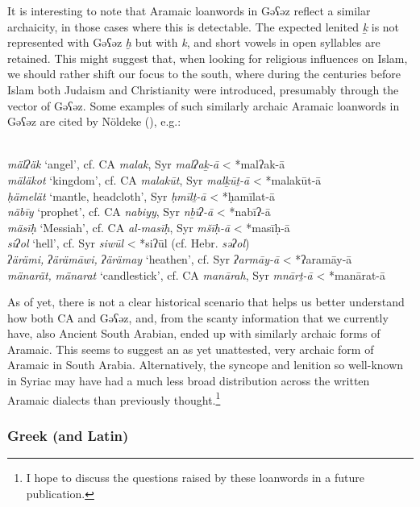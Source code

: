 \documentclass[output=paper]{langsci/langscibook}
\begin{document}
It is interesting to note that Aramaic loanwords in Gəʕəz reflect a similar archaicity, in those cases where this is detectable. The expected lenited \textit{ḵ} is not represented with Gəʕəz \textit{ḫ} but with \textit{k}, and short vowels in open syllables are retained. This might suggest that, when looking for religious influences on Islam, we should rather shift our focus to the south, where during the centuries before Islam both Judaism and Christianity were introduced, presumably through the vector of Gəʕəz. Some examples of such similarly archaic Aramaic loanwords in Gəʕəz are cited by Nöldeke (\citeyear[31--46]{Nöldeke1910}), e.g.:

\ea {}\\
\ea \textit{mälʔäk} ‘angel’, cf. CA \textit{malak}, Syr \textit{malʔaḵ-ā} < *malʔak-ā\\
\ex \textit{mäläkot} ‘kingdom’, cf. CA \textit{malakūt}, Syr \textit{malḵūṯ-ā} < *malakūt-ā\\
\ex \textit{ḥämelät} ‘mantle, headcloth’, Syr \textit{ḥmīlṯ-ā} < *ḥamīlat-ā\\
\ex \textit{näbīy} ‘prophet’, cf. CA \textit{nabiyy}, Syr \textit{nḇīʔ{}-ā} < *nabīʔ-ā\\
\ex \textit{mäsīḥ} ‘Messiah’, cf. CA \textit{al-masīḥ}, Syr \textit{mšīḥ-ā} < *masīḥ-ā\\
\ex \textit{siʔol} ‘hell’, cf. Syr \textit{siwūl} < *siʔūl (cf. Hebr. \textit{səʔol})\\
\ex \textit{ʔärämi,} \textit{ʔärämāwi,} \textit{ʔärämay} ‘heathen’, cf. Syr \textit{ʔarmāy-ā} < *ʔaramāy-ā\\
\ex \textit{mänarät,} \textit{mänarat} ‘candlestick’, cf. CA \textit{manārah}, Syr \textit{mnārṯ-ā} < *manārat-ā
\z
\z

As of yet, there is not a clear historical scenario that helps us better understand how both CA and Gəʕəz, and, from the scanty information that we currently have, also Ancient South Arabian, ended up with similarly archaic forms of Aramaic. This seems to suggest an as yet unattested, very archaic form of Aramaic in South Arabia. Alternatively, the syncope and lenition so well-known in Syriac may have had a much less broad distribution across the written Aramaic dialects than previously thought.\footnote{I hope to discuss the questions raised by these loanwords in a future publication.}

\subsubsection{\label{bkm:Ref13224479}Greek (and Latin)}
\end{document}
